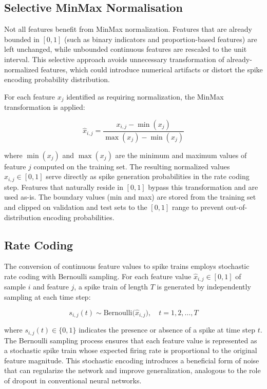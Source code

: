 \subsection{Selective MinMax Normalisation}
\label{sec:snn-minmax}

Not all features benefit from MinMax normalization. Features that are already bounded in $[0, 1]$ (such as binary indicators and proportion-based features) are left unchanged, while unbounded continuous features are rescaled to the unit interval. This selective approach avoids unnecessary transformation of already-normalized features, which could introduce numerical artifacts or distort the spike encoding probability distribution.

For each feature $x_j$ identified as requiring normalization, the MinMax transformation is applied:

\begin{equation}
\hat{x}_{i,j} = \frac{x_{i,j} - \min(x_j)}{\max(x_j) - \min(x_j)}
\label{eq:snn-minmax}
\end{equation}

where $\min(x_j)$ and $\max(x_j)$ are the minimum and maximum values of feature $j$ computed on the training set. The resulting normalized values $\hat{x}_{i,j} \in [0, 1]$ serve directly as spike generation probabilities in the rate coding step. Features that naturally reside in $[0, 1]$ bypass this transformation and are used as-is. The boundary values (min and max) are stored from the training set and clipped on validation and test sets to the $[0, 1]$ range to prevent out-of-distribution encoding probabilities.

\subsection{Rate Coding}

The conversion of continuous feature values to spike trains employs stochastic rate coding with Bernoulli sampling. For each feature value $\hat{x}_{i,j} \in [0, 1]$ of sample $i$ and feature $j$, a spike train of length $T$ is generated by independently sampling at each time step:

\begin{equation}
s_{i,j}(t) \sim \text{Bernoulli}\bigl(\hat{x}_{i,j}\bigr), \quad t = 1, 2, \ldots, T
\label{eq:snn-rate-coding}
\end{equation}

where $s_{i,j}(t) \in \{0, 1\}$ indicates the presence or absence of a spike at time step $t$. The Bernoulli sampling process ensures that each feature value is represented as a stochastic spike train whose expected firing rate is proportional to the original feature magnitude. This stochastic encoding introduces a beneficial form of noise that can regularize the network and improve generalization, analogous to the role of dropout in conventional neural networks.

